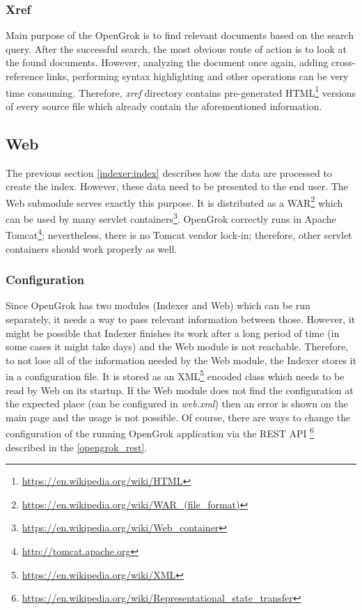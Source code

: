 \subsubsection{Xref}
\label{indexer:xref}

Main purpose of the OpenGrok is to find relevant documents based on the search query. After the successful search, the most
obvious route of action is to look at the found documents. However, analyzing the document once again,
adding cross-reference links, performing syntax
highlighting and other operations can be very time consuming. Therefore, \textit{xref} directory contains pre-generated
HTML\footnote{\url{https://en.wikipedia.org/wiki/HTML}} versions of every source file which already contain the
aforementioned information.

\subsection{Web}
\label{opengrok-web}

The previous section \ref{indexer:index} describes how the data are processed to create the index. However, these data need
to be presented to the end user. The Web submodule serves exactly this purpose. It is distributed as a
WAR\footnote{\url{https://en.wikipedia.org/wiki/WAR\_(file\_format)}} which can be used by many
servlet containers\footnote{\url{https://en.wikipedia.org/wiki/Web\_container}}. OpenGrok correctly runs in
Apache Tomcat\footnote{\url{http://tomcat.apache.org}}; nevertheless, there is no Tomcat vendor lock-in; therefore,
other servlet containers should work properly as well.

\subsubsection{Configuration}
\label{opengrok_configuration}

Since OpenGrok has two modules (Indexer and Web) which can be run separately, it needs a way to pass relevant
information between those. However, it might be possible that Indexer finishes its work after a long period of time
(in some cases it might take days) and the Web module is not reachable. Therefore, to not lose all of the information
needed by the Web module, the Indexer stores it in a configuration file. It is stored as an
XML\footnote{\url{https://en.wikipedia.org/wiki/XML}} encoded class which needs to be read by Web on its startup.
If the Web module does not find the configuration at the expected place (can be configured in \textit{web.xml}) then an
error is shown on the main page and the usage is not possible. Of course, there are ways to change the configuration
of the running OpenGrok application via the REST API \footnote{\url{https://en.wikipedia.org/wiki/Representational\_state\_transfer}}
described in the \ref{opengrok_rest}.

